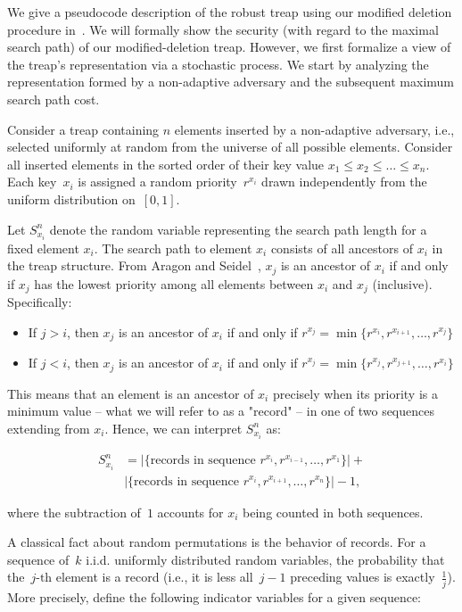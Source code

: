 We give a pseudocode description of the robust treap using our modified deletion procedure in~. We will formally show the security (with regard to the maximal search path) of our modified-deletion treap. However, we first formalize a view of the treap's representation via a stochastic process. We start by analyzing the representation formed by a non-adaptive adversary and the subsequent maximum search path cost. 

Consider a treap containing $n$ elements inserted by a non-adaptive adversary, i.e., selected uniformly at random from the universe of all possible elements. Consider all inserted elements in the sorted order of their key value $x_1 \leq x_2 \leq \ldots \leq x_n$. Each key~$x_i$ is assigned a random priority~$r^{x_{i}}$ drawn independently from the uniform distribution on~$[0,1]$. 

Let $S^n_{x_i}$ denote the random variable representing the search path length for a fixed element $x_i$. The search path to element $x_i$ consists of all ancestors of $x_i$ in the treap structure. From Aragon and Seidel~\cite{aragon1989randomized}, $x_j$ is an ancestor of $x_i$ if and only if $x_j$ has the lowest priority among all elements between $x_i$ and $x_j$ (inclusive). Specifically:

\begin{itemize}
    \item If $j > i$, then $x_j$ is an ancestor of $x_i$ if and only if $r^{x_j} = \min\{r^{x_i}, r^{x_{i+1}}, \ldots, r^{x_j}\}$
    \item If $j < i$, then $x_j$ is an ancestor of $x_i$ if and only if $r^{x_j} = \min\{r^{x_j}, r^{x_{j+1}}, \ldots, r^{x_i}\}$
\end{itemize}

This means that an element is an ancestor of $x_i$ precisely when its priority is a minimum value -- what we will refer to as a "record" -- in one of two sequences extending from $x_i$. Hence, we can interpret $S^n_{x_i}$ as:

\begin{align*}
S^n_{x_i} &= |\{\text{records in sequence } r^{x_i},r^{x_{i-1}},\ldots,r^{x_1}\}| + \\&|\{\text{records in sequence } r^{x_i},r^{x_{i+1}},\ldots,r^{x_n}\}| - 1,
\end{align*}

where the subtraction of~$1$ accounts for $x_i$ being counted in both sequences. 

A classical fact about random permutations is the behavior of records. For a sequence of~$k$ i.i.d. uniformly distributed random variables, the probability that the~$j\text{-th}$ element is a record (i.e., it is less all~$j-1$ preceding values is exactly~$\frac{1}{j}$). More precisely, define the following indicator variables for a given sequence:


